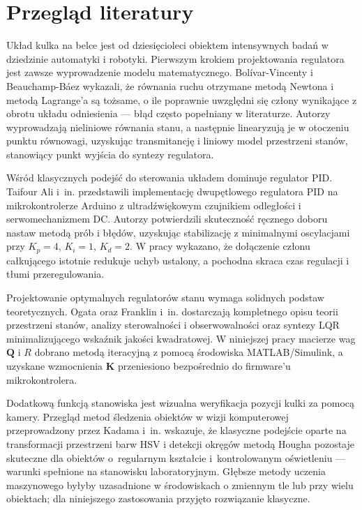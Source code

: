 \section{Przegląd literatury}

Układ kulka na belce jest od dziesięcioleci obiektem intensywnych badań w dziedzinie
automatyki i robotyki.
Pierwszym krokiem projektowania regulatora jest zawsze wyprowadzenie modelu matematycznego.
Bolívar-Vincenty i Beauchamp-Báez \cite{bolivar2014modelling} wykazali, że równania ruchu
otrzymane metodą Newtona i metodą Lagrange'a są tożsame, o ile poprawnie uwzględni się
człony wynikające z obrotu układu odniesienia — błąd często popełniany w literaturze.
Autorzy wyprowadzają nieliniowe równania stanu, a następnie linearyzują je w otoczeniu
punktu równowagi, uzyskując transmitancję i liniowy model przestrzeni stanów, stanowiący
punkt wyjścia do syntezy regulatora.

Wśród klasycznych podejść do sterowania układem dominuje regulator PID.
Taifour Ali i~in. \cite{taifour2017design} przedstawili implementację dwupętlowego
regulatora PID na mikrokontrolerze Arduino z ultradźwiękowym czujnikiem odległości
i serwomechanizmem DC.
Autorzy potwierdzili skuteczność ręcznego doboru nastaw metodą prób i błędów,
uzyskując stabilizację z minimalnymi oscylacjami przy $K_p{=}4$, $K_i{=}1$, $K_d{=}2$.
W pracy wykazano, że dołączenie członu całkującego istotnie redukuje uchyb ustalony,
a pochodna skraca czas regulacji i tłumi przeregulowania.

Projektowanie optymalnych regulatorów stanu wymaga solidnych podstaw teoretycznych.
Ogata \cite{ogata2010modern} oraz Franklin i~in. \cite{franklin2014feedback} dostarczają
kompletnego opisu teorii przestrzeni stanów, analizy sterowalności i obserwowalności
oraz syntezy LQR minimalizującego wskaźnik jakości kwadratowej.
W niniejszej pracy macierze wag $\mathbf{Q}$ i $R$ dobrano metodą iteracyjną
z pomocą środowiska MATLAB/Simulink, a uzyskane wzmocnienia $\mathbf{K}$ przeniesiono
bezpośrednio do firmware'u mikrokontrolera.

Dodatkową funkcją stanowiska jest wizualna weryfikacja pozycji kulki za pomocą kamery.
Przegląd metod śledzenia obiektów w wizji komputerowej przeprowadzony przez
Kadama i~in. \cite{kadam2024object} wskazuje, że klasyczne podejście oparte na transformacji
przestrzeni barw HSV i detekcji okręgów metodą Hougha pozostaje skuteczne dla
obiektów o~regularnym kształcie i~kontrolowanym oświetleniu — warunki spełnione
na stanowisku laboratoryjnym.
Głębsze metody uczenia maszynowego byłyby uzasadnione w środowiskach o zmiennym tle
lub przy wielu obiektach; dla niniejszego zastosowania przyjęto rozwiązanie klasyczne.

